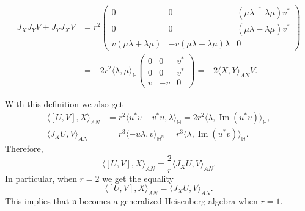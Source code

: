\documentclass[12pt, a4paper]{amsart}
\newcommand{\g}{\mathfrak}
\renewcommand{\H}{\mathbb{H}}
\renewcommand{\Im}{\operatorname{Im}}
\theoremstyle{remark}
\begin{document}
\[
\begin{aligned}
J_X J_Y V+J_Y J_X V
&{}=r^2\left(
\begin{array}{cc|c}
	0 & 0 & (\overline{\mu\lambda-\lambda\mu})v^{*} \\
	0 & 0 & (\overline{\mu\lambda-\lambda\mu})v^{*} \\
	\hline
	v(\mu\lambda+\lambda\mu) & -v(\mu\lambda+\lambda\mu)\lambda & 0
\end{array}
\right)\\
&{}=-2r^2\langle\lambda,\mu\rangle_{\H} \left(
\begin{array}{cc|c}
	0 & 0 & v^{*} \\
	0 & 0 & v^{*} \\
	\hline
	v  & -v & 0
\end{array}
\right)
=-2\langle X,Y\rangle_{AN} V.
\end{aligned}
\]

With this definition we also get
\[
\begin{aligned}
\langle[U,V],X\rangle_{AN}
&{}=r^2\langle u^*v-v^*u,\lambda\rangle_{\H}
=2r^2\langle\lambda,\Im(u^*v)\rangle_\H,\\
\langle J_X U,V\rangle_{AN}
&{}=r^3\langle -u\lambda,v\rangle_{\H^n}
=r^3\langle\lambda,\Im(u^*v)\rangle_\H.
\end{aligned}
\]
Therefore,
\[
\langle[U,V],X\rangle_{AN}=\frac{2}{r}\langle J_X U,V\rangle_{AN}.
\]	
In particular, when $r=2$ we get the equality
\[
	\langle [U,V],X\rangle_{AN}=\langle J_{X}U,V\rangle_{AN}.
\]
This implies that $\g{n}$ becomes a generalized Heisenberg algebra when $r=1$.
\end{document}
